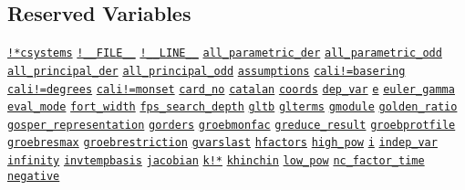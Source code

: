 \begin{list}{}
\section{Reserved Variables}

\doubleinterwordspace
\hyperlink{reserved:!*CSYSTEMS}{\texttt{!*csystems}}
\hyperlink{reserved:__FILE__}{\texttt{!\_\_FILE\_\_}}
\hyperlink{reserved:__LINE__}{\texttt{!\_\_LINE\_\_}}
\hyperlink{variable:ALL_PARAMETRIC_DER}{\texttt{all\_parametric\_der}}
\hyperlink{variable:ALL_PARAMETRIC_ODD}{\texttt{all\_parametric\_odd}}
\hyperlink{variable:ALL_PRINCIPAL_DER}{\texttt{all\_principal\_der}}
\hyperlink{variable:ALL_PRINCIPAL_ODD}{\texttt{all\_principal\_odd}}
\hyperlink{reserved:assumptions}{\texttt{assumptions}}
\hyperlink{variable:CALI!=BASERING}{\texttt{cali!=basering}}
\hyperlink{variable:CALI!=DEGREES}{\texttt{cali!=degrees}}
\hyperlink{variable:CALI!=MONSET}{\texttt{cali!=monset}}
\hyperlink{reserved:CARD_NO}{\texttt{card\_no}}
\hyperlink{reserved:CATALAN}{\texttt{catalan}}
\hyperlink{reserved:COORDS}{\texttt{coords}}
\hyperlink{variable:DEP_VAR}{\texttt{dep\_var}}
\hyperlink{reserved:E}{\texttt{e}}
\hyperlink{reserved:EULER_GAMMA}{\texttt{euler\_gamma}}
\hyperlink{target:modes}{\texttt{eval\_mode}}
\hyperlink{reserved:FORT_WIDTH}{\texttt{fort\_width}}
\hyperlink{reserved:FPS_SEARCH_DEPTH}{\texttt{fps\_search\_depth}}
\hyperlink{reserved:GLTB}{\texttt{gltb}}
\hyperlink{reserved:GLTERMS}{\texttt{glterms}}
\hyperlink{reserved:GMODULE}{\texttt{gmodule}}
\hyperlink{reserved:GOLDEN_RATIO}{\texttt{golden\_ratio}}
\hyperlink{reserved:GOSPER_REPRESENTATION}{\texttt{gosper\_representation}}
\hyperlink{reserved:GORDERS}{\texttt{gorders}}
\hyperlink{reserved:GROEBMONFAC}{\texttt{groebmonfac}}
\hyperlink{reserved:GREDUCE_RESULT}{\texttt{greduce\_result}}
\hyperlink{reserved:GROEBPROTFILE}{\texttt{groebprotfile}}
\hyperlink{reserved:GROEBRESMAX}{\texttt{groebresmax}}
\hyperlink{reserved:GROEBRESTRICTION}{\texttt{groebrestriction}}
\hyperlink{reserved:GVARSLAST}{\texttt{gvarslast}}
\hyperlink{reserved:HFACTORS}{\texttt{hfactors}}
\hyperlink{reserved:HIGH_POW}{\texttt{high\_pow}}
\hyperlink{reserved:I}{\texttt{i}}
\hyperlink{variable:INDEP_VAR}{\texttt{indep\_var}}
\hyperlink{reserved:INFINITY}{\texttt{infinity}}
\hyperlink{variable:INVTEMPBASIS}{\texttt{invtempbasis}}
\hyperlink{reserved:JACOBIAN}{\texttt{jacobian}}
\hyperlink{reserved:K!*}{\texttt{k!*}}
\hyperlink{reserved:KHINCHIN}{\texttt{khinchin}}
\hyperlink{reserved:LOW_POW}{\texttt{low\_pow}}
\hyperlink{variable:NC_FACTOR_TIME}{\texttt{nc\_factor\_time}}
\hyperlink{reserved:NEGATIVE}{\texttt{negative}}

\end{list}
